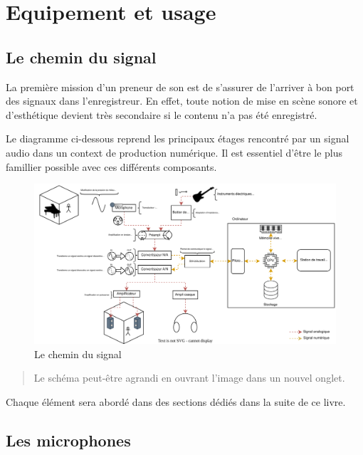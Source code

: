 \documentclass[
]{book}
\begin{document}
\hypertarget{part-equipement-et-usage}{%
\part{Equipement et usage}\label{part-equipement-et-usage}}

\hypertarget{le-chemin-du-signal}{%
\chapter{Le chemin du signal}\label{le-chemin-du-signal}}

La première mission d'un preneur de son est de s'assurer de l'arriver à bon port des signaux dans l'enregistreur. En effet, toute notion de mise en scène sonore et d'esthétique devient très secondaire si le contenu n'a pas été enregistré.

Le diagramme ci-dessous reprend les principaux étages rencontré par un signal audio dans un context de production numérique. Il est essentiel d'être le plus famillier possible avec ces différents composants.

\begin{figure}

{\centering \includegraphics[width=1\linewidth]{_resources/diagrams/cheminSignal} 

}

\caption{Le chemin du signal}\label{fig:unnamed-chunk-15}
\end{figure}

\begin{quote}
Le schéma peut-être agrandi en ouvrant l'image dans un nouvel onglet.
\end{quote}

Chaque élément sera abordé dans des sections dédiés dans la suite de ce livre.

\hypertarget{les-microphones}{%
\chapter{Les microphones}\label{les-microphones}}
\end{document}

